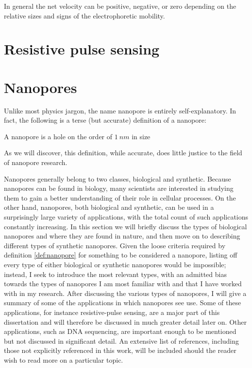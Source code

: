 			In general the net velocity can be positive, negative, or zero depending on the relative sizes and signs of the electrophoretic mobility.


			
			
			
	\section{Resistive pulse sensing}
		
		
			
			
			
	\section{Nanopores}

		Unlike most physics jargon, the name nanopore is entirely self-explanatory. In fact, the following is a terse (but accurate) definition of a nanopore:


		\begin{definition} \label{def:nanopore}
			A nanopore is a hole on the order of $\SI{1}{nm}$ in size
		\end{definition}


		As we will discover, this definition, while accurate, does little justice to the field of nanopore research. 

		Nanopores generally belong to two classes, biological and synthetic. Because nanopores can be found in biology, many scientists are interested in studying them to gain a better understanding of their role in cellular processes. On the other hand, nanopores, both biological and synthetic, can be used in a surprisingly large variety of applications, with the total count of such applications constantly increasing. In this section we will briefly discuss the types of biological nanopores and where they are found in nature, and then move on to describing different types of synthetic nanopores. Given the loose criteria required by definition \ref{def:nanopore} for something to be considered a nanopore, listing off every type of either biological or synthetic nanopores would be impossible; instead, I seek to introduce the most relevant types, with an admitted bias towards the types of nanopores I am most familiar with and that I have worked with in my research. After discussing the various types of nanopores, I will give a summary of some of the applications in which nanopores see use. Some of these applications, for instance resistive-pulse sensing, are a major part of this dissertation and will therefore be discussed in much greater detail later on. Other applications, such as DNA sequencing, are important enough to be mentioned but not discussed in significant detail. An extensive list of references, including those not explicitly referenced in this work, will be included should the reader wish to read more on a particular topic.

